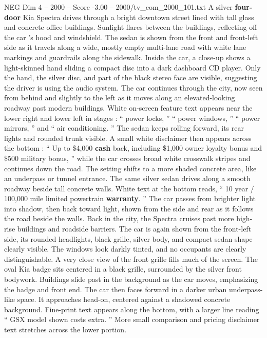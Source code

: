 \begin{textsample}{NEG Dim 4 – 2000 – Score -3.00 – 2000/tv\_com\_2000\_101.txt}  \label{ex:f4_neg_042}
A silver \textbf{four-door} Kia Spectra drives through a bright downtown street lined with tall glass and concrete office buildings.
Sunlight flares between the buildings, reflecting off the car ’s hood and windshield.
The sedan is shown from the front and front-left side as it travels along a wide, mostly empty multi-lane road with white lane markings and guardrails along the sidewalk.
Inside the car, a close-up shows a light-skinned hand sliding a compact disc into a dark dashboard CD player.
Only the hand, the silver disc, and part of the black stereo face are visible, suggesting the driver is using the audio system.
The car continues through the city, now seen from behind and slightly to the left as it moves along an elevated-looking roadway past modern buildings.
White on-screen feature text appears near the lower right and lower left in stages : “ power locks, ” “ power windows, ” “ power mirrors, ” and “ air conditioning. ” The sedan keeps rolling forward, its rear lights and rounded trunk visible.
A small white disclaimer then appears across the bottom : “ Up to \$4,000 \textbf{cash} back, including \$1,000 owner loyalty bonus and \$500 military bonus, ” while the car crosses broad white crosswalk stripes and continues down the road.
The setting shifts to a more shaded concrete area, like an underpass or tunnel entrance.
The same silver sedan drives along a smooth roadway beside tall concrete walls.
White text at the bottom reads, “ 10 year / 100,000 mile limited powertrain \textbf{warranty}. ” The car passes from brighter light into shadow, then back toward light, shown from the side and rear as it follows the road beside the walls.
Back in the city, the Spectra cruises past more high-rise buildings and roadside barriers.
The car is again shown from the front-left side, its rounded headlights, black grille, silver body, and compact sedan shape clearly visible.
The windows look darkly tinted, and no occupants are clearly distinguishable.
A very close view of the front grille fills much of the screen.
The oval Kia badge sits centered in a black grille, surrounded by the silver front bodywork.
Buildings slide past in the background as the car moves, emphasizing the badge and front end.
The car then faces forward in a darker urban underpass-like space.
It approaches head-on, centered against a shadowed concrete background.
Fine-print text appears along the bottom, with a larger line reading “ GSX model shown costs extra. ” More small comparison and pricing disclaimer text stretches across the lower portion.

\end{textsample}
